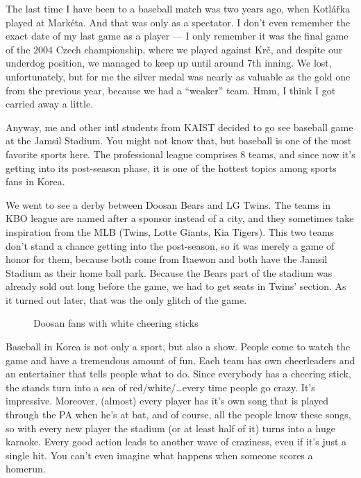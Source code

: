 \begin{post}
	\begin{content}
The last time I have been to a baseball match was two years ago, when Kotlářka played at Markéta. And that was only as a spectator. I don't even remember the exact date of my last game as a player --- I only remember it was the final game of the 2004 Czech championship, where we played against Krč, and despite our underdog position, we managed to keep up until around 7th inning. We lost, unfortunately, but for me the silver medal was nearly as valuable as the gold one from the previous year, because we had a ``weaker'' team. Hmm, I think I got carried away a little.

Anyway, me and other intl students from KAIST decided to go see baseball game at the Jamsil Stadium. You might not know that, but baseball is one of the most favorite sports here. The professional league comprises 8 teams, and since now it's getting into its post-season phase, it is one of the hottest topics among sports fans in Korea.

We went to see a derby between Doosan Bears and LG Twins. The teams in KBO league are named after a sponsor instead of a city, and they sometimes take inspiration from the MLB (Twins, Lotte Giants, Kia Tigers). This two teams don't stand a chance getting into the post-season, so it was merely a game of honor for them, because both come from Itaewon and both have the Jamsil Stadium as their home ball park. Because the Bears part of the stadium was already sold out long before the game, we had to get seats in Twins' section. As it turned out later, that was the only glitch of the game.

\begin{figure}
\centering
{}
\caption{Doosan fans with white cheering sticks}
\vspace{-24pt}
\end{figure}

Baseball in Korea is not only a sport, but also a show. People come to watch the game and have a tremendous amount of fun. Each team has own cheerleaders and an entertainer that tells people what to do. Since everybody has a cheering stick, the stands turn into a sea of red/white/\ldots every time people go crazy. It's impressive. Moreover, (almost) every player has it's own song that is played through the PA when he's at bat, and of course, all the people know these songs, so with every new player the stadium (or at least half of it) turns into a huge karaoke. Every good action leads to another wave of craziness, even if it's just a single hit. You can't even imagine what happens when someone scores a homerun.


\end{content}
\end{post}
